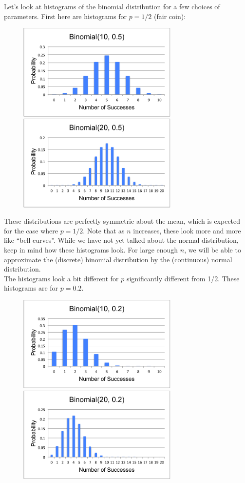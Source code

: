 \documentclass[notes.tex]{subfiles}
\begin{document}
Let's look at histograms of the binomial distribution for a few choices of parameters. First here are histograms for $p=1/2$ (fair coin):
\begin{figure}[H]
\centering
\includegraphics[width=8cm]{binomial105}
\includegraphics[width=8cm]{binomial205}
\end{figure}
These distributions are perfectly symmetric about the mean, which is expected for the case where $p = 1/2$. Note that as $n$ increases, these look more and more like ``bell curves''. While we have not yet talked about the normal distribution, keep in mind how these histograms look. For large enough $n$, we will be able to approximate the (discrete) binomial distribution by the (continuous) normal distribution.\\

The histograms look a bit different for $p$ significantly different from 1/2. These histograms are for $p = 0.2$.
\begin{figure}[H]
\centering
\includegraphics[width=8cm]{binomial102}
\includegraphics[width=8cm]{binomial202}
\end{figure}
\end{document}
